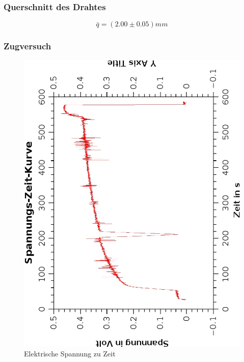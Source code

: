 \documentclass{article}
\begin{document}
\subsubsection*{Querschnitt des Drahtes}
$$\bar{q}=(2.00 \pm 0.05)mm$$ 
\subsubsection*{Zugversuch}
\begin{center}
\begin{figure}
\caption{Elektrische Spannung zu Zeit}
\includegraphics[scale=0.8, angle=-90]{voltzeitkurve.eps}
\end{figure}
\end{center}
\end{document}
